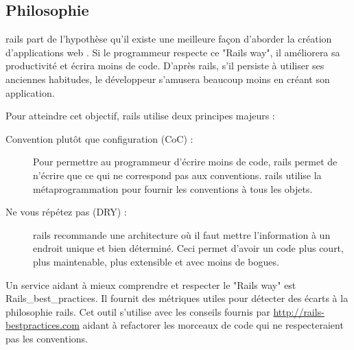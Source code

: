 \subsection{Philosophie}
\gls{rails} part de l'hypothèse qu'il existe une meilleure façon d'aborder la création d'applications web \cite{rails-guides}. Si le programmeur respecte ce "Rails way", il améliorera sa productivité et écrira moins de code. D'après \gls{rails}, s’il persiste à utiliser ses anciennes habitudes, le développeur s'amusera beaucoup moins en créant son application.

Pour atteindre cet objectif, \gls{rails} utilise deux principes majeurs :
\begin{description}
  \item[Convention plutôt que configuration (CoC) \cite{wiki-coc} :] Pour permettre au programmeur d'écrire moins de code, \gls{rails} permet de n'écrire que ce qui ne correspond pas aux conventions. \gls{rails} utilise la métaprogrammation pour fournir les conventions à tous les objets.
  \item[Ne vous répétez  pas (DRY) \cite{wiki-dry} :] \gls{rails} recommande une architecture où il faut mettre l'information à un endroit unique et bien déterminé. Ceci permet d'avoir un code plus court, plus maintenable, plus extensible et avec moins de bogues.
\end{description}

\label{rbp}
Un service aidant à mieux comprendre et respecter le "Rails way" est Rails\_best\_practices. Il fournit des métriques utiles pour détecter des écarts à la philosophie \gls{rails}. Cet outil s'utilise avec les conseils fournis par \url{http://rails-bestpractices.com} aidant à refactorer les morceaux de code qui ne respecteraient pas les conventions.

